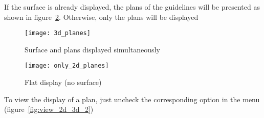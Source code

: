 \newpage



If the surface is already displayed, the plans of the guidelines will be presented as shown in figure~\ref{fig:only_2d_planes}. Otherwise, only the plans will be displayed

\begin{figure}[!htb]
\centering
\texttt{[image: 3d\_planes]}
\caption{Surface and plans displayed simultaneously}
\label{fig:3d_planes}
\end{figure}

\begin{figure}[!htb]
\centering
\texttt{[image: only\_2d\_planes]}
\caption{Flat display (no surface)}
\label{fig:only_2d_planes}
\end{figure}

\newpage


To view the display of a plan, just uncheck the corresponding option in the menu (figure~\ref{fig:view_2d_3d_2})